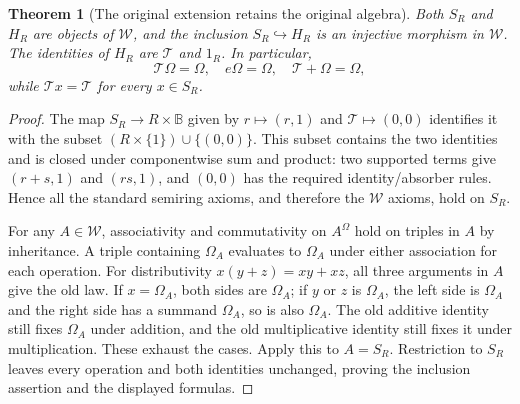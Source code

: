\documentclass[11pt]{article}
\newtheorem{theorem}{Theorem}
\newcommand{\B}{\mathbb B}
\begin{document}
\begin{theorem}[The original extension retains the original algebra]
Both $S_R$ and $H_R$ are objects of $\mathcal W$, and the inclusion $S_R\hookrightarrow H_R$ is an injective morphism in $\mathcal W$. The identities of $H_R$ are $\mathcal T$ and $1_R$. In particular,
\[
\mathcal T\Omega=\Omega,\quad e\Omega=\Omega,
\quad \mathcal T+\Omega=\Omega,
\]
while $\mathcal T x=\mathcal T$ for every $x\in S_R$.
\end{theorem}
\begin{proof}
The map $S_R\to R\times\B$ given by $r\mapsto(r,1)$ and $\mathcal T\mapsto(0,0)$ identifies it with the subset $(R\times\{1\})\cup\{(0,0)\}$. This subset contains the two identities and is closed under componentwise sum and product: two supported terms give $(r+s,1)$ and $(rs,1)$, and $(0,0)$ has the required identity/absorber rules. Hence all the standard semiring axioms, and therefore the $\mathcal W$ axioms, hold on $S_R$.

For any $A\in\mathcal W$, associativity and commutativity on $A^\Omega$ hold on triples in $A$ by inheritance. A triple containing $\Omega_A$ evaluates to $\Omega_A$ under either association for each operation. For distributivity $x(y+z)=xy+xz$, all three arguments in $A$ give the old law. If $x=\Omega_A$, both sides are $\Omega_A$; if $y$ or $z$ is $\Omega_A$, the left side is $\Omega_A$ and the right side has a summand $\Omega_A$, so is also $\Omega_A$. The old additive identity still fixes $\Omega_A$ under addition, and the old multiplicative identity still fixes it under multiplication. These exhaust the cases. Apply this to $A=S_R$. Restriction to $S_R$ leaves every operation and both identities unchanged, proving the inclusion assertion and the displayed formulas.
\end{proof}
\end{document}
